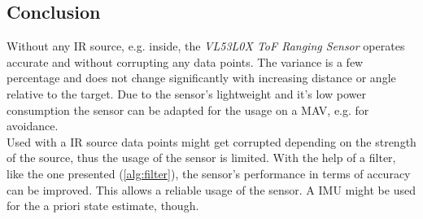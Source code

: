 \subsection{Conclusion}
Without any IR source, e.g. inside, the \textit{VL53L0X ToF Ranging Sensor} operates accurate and without corrupting any data points. The variance is a few percentage and does not change significantly with increasing distance or angle relative to the target. Due to the sensor's lightweight and it's low power consumption the sensor can be adapted for the usage on a MAV, e.g. for avoidance. \\
Used with a IR source data points might get corrupted depending on the strength of the source, thus the usage of the sensor is limited. With the help of a filter, like the one presented (\cref{alg:filter}), the sensor's performance in terms of accuracy can be improved. This allows a reliable usage of the sensor. A IMU might be used for the a priori state estimate, though. \\

